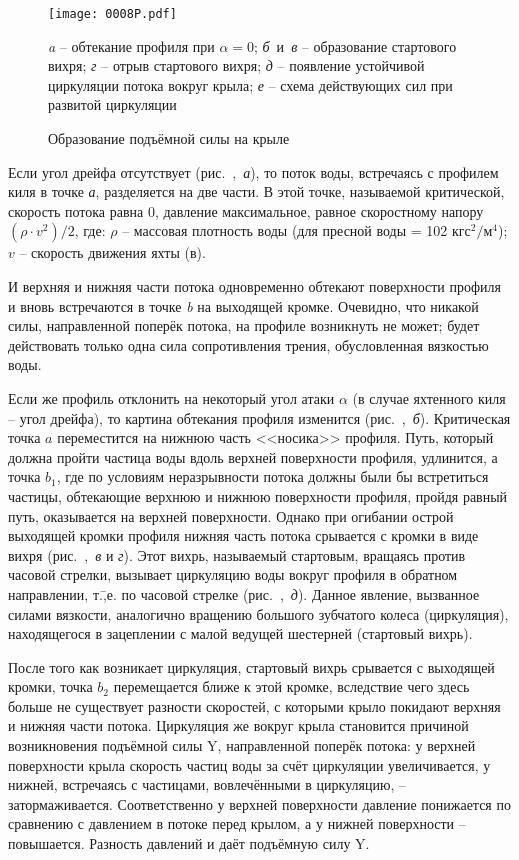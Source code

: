 \begin{figure*}[htb]
  \centering
  \texttt{[image: 0008P.pdf]}
  \caption{Образование подъёмной силы на крыле}
  \label{fig:8}
  \centering{}\small \textit{a} \--- обтекание профиля при $\alpha = 0$;
                     \textit{б}~и~\textit{в} \--- образование стартового вихря;
                     \textit{г} \--- отрыв стартового вихря;
                     \textit{д} \--- появление устойчивой циркуляции потока вокруг крыла;
                     \textit{е} \--- схема действующих сил при развитой циркуляции
\end{figure*}

Если угол дрейфа отсутствует (рис.~,~\textit{а}), то поток
воды, встречаясь с профилем киля в точке \textit{а}, разделяется на
две части. В этой точке, называемой критической, скорость потока равна
0, давление максимальное, равное скоростному напору
$(\rho \cdot v^2) / 2$, где: $\rho$ \--- массовая плотность воды (для
пресной воды = 102 $\text{кгс}^2 / \text{м}^4$); $v$ \--- скорость
движения яхты (в\speedms).

И верхняя и нижняя части потока одновременно обтекают поверхности
профиля и вновь встречаются в точке \textit{b} на выходящей
кромке. Очевидно, что никакой силы, направленной поперёк потока, на
профиле возникнуть не может; будет действовать только одна сила
сопротивления трения, обусловленная вязкостью воды.

Если же профиль отклонить на некоторый угол атаки $\alpha$ (в случае
яхтенного киля \--- угол дрейфа), то картина обтекания профиля
изменится (рис.~,~\textit{б}). Критическая точка $a$
переместится на нижнюю часть <<носика>> профиля. Путь, который должна
пройти частица воды вдоль верхней поверхности профиля, удлинится, а
точка $b_1$, где по условиям неразрывности потока должны были бы
встретиться частицы, обтекающие верхнюю и нижнюю поверхности профиля,
пройдя равный путь, оказывается на верхней поверхности. Однако при
огибании острой выходящей кромки профиля нижняя часть потока срывается
с кромки в виде вихря (рис.~,~\textit{в} и \textit{г}). Этот
вихрь, называемый стартовым, вращаясь против часовой стрелки, вызывает
циркуляцию воды вокруг профиля в обратном направлении, т.\=,е. по
часовой стрелке (рис.~,~\textit{д}). Данное явление, вызванное
силами вязкости, аналогично вращению большого зубчатого колеса
(циркуляция), находящегося в зацеплении с малой ведущей шестерней
(стартовый вихрь).

После того как возникает циркуляция, стартовый вихрь срывается с
выходящей кромки, точка $b_2$ перемещается ближе к этой кромке,
вследствие чего здесь больше не существует разности скоростей, с
которыми крыло покидают верхняя и нижняя части потока. Циркуляция же
вокруг крыла становится причиной возникновения подъёмной силы \ve Y,
направленной поперёк потока: у верхней поверхности крыла скорость
частиц воды за счёт циркуляции увеличивается, у нижней, встречаясь с
частицами, вовлечёнными в циркуляцию, \---
затормаживается. Соответственно у верхней поверхности давление
понижается по сравнению с давлением в потоке перед крылом, а у нижней
поверхности \--- повышается. Разность давлений и даёт подъёмную силу
\ve Y.

